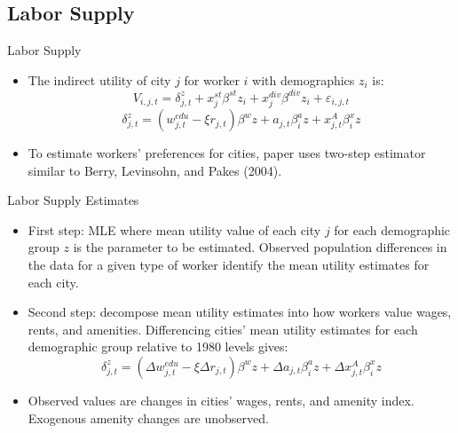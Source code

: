 \documentclass[aspectratio=169]{beamer}
\begin{document}
\subsection{Labor Supply}


\begin{frame}{Labor Supply}

\begin{itemize}
    \item<1-> The indirect utility of city $ j $ for worker $ i $ with demographics $ z_{i} $ is:
    \begin{equation*}
        V_{i,j,t} = \delta_{j,t}^{z} + x_{j}^{st} \beta^{st} z_{i} + x_{j}^{div} \beta^{div} z_{i} + \varepsilon_{i,j,t}
    \end{equation*}
    \begin{equation*}
        \delta_{j,t}^{z} = \left( w_{j,t}^{edu} - \xi r_{j,t} \right) \beta^{w} z + a_{j,t} \beta_{i}^{a} z + x_{j,t}^{A} \beta_{i}^{x} z
    \end{equation*}
    \item<2->  To estimate workers’ preferences for cities, paper uses two-step estimator similar to Berry, Levinsohn, and Pakes (2004).
\end{itemize}
    
\end{frame}


\begin{frame}{Labor Supply Estimates}

\begin{itemize}
    \item<1-> First step: MLE where mean utility value of each city $ j $ for each demographic group $ z $ is the parameter to be estimated.  Observed population differences in the data for a given type of worker identify the mean utility estimates for each city.
    \item<2-> Second step:  decompose mean utility estimates into how workers value wages, rents, and amenities.  Differencing cities’ mean utility estimates for each demographic group relative to 1980 levels gives:
    \begin{equation}
        \delta_{j,t}^{z} = \left( \Delta w_{j,t}^{edu} - \xi \Delta r_{j,t} \right) \beta^{w} z + \Delta a_{j,t} \beta_{i}^{a} z + \Delta x_{j,t}^{A} \beta_{i}^{x} z
        \label{eq:deltaamenities1}
    \end{equation}
    \item<3->  Observed values are changes in cities’ wages, rents, and amenity index.  Exogenous amenity changes are unobserved.
\end{itemize}
    
\end{frame}
\end{document}
